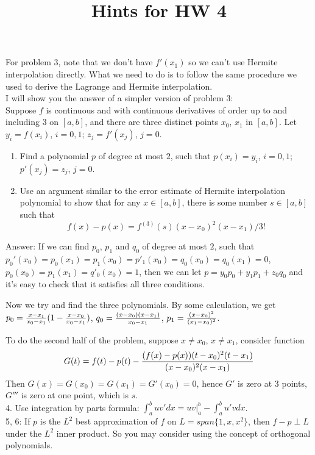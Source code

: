 \documentclass[20pt]{article} %
\title{Hints for HW 4}
\theoremstyle{break}
\begin{document}
\maketitle

For problem 3, note that we don't have $f'(x_1)$ so we can't use Hermite interpolation directly. What we need to do is to follow the same procedure we used to derive the Lagrange and Hermite interpolation.\\

I will show you the answer of a simpler version of problem 3:\\

Suppose $f$ is continuous and with continuous derivatives of order up to and including 3 on $[a, b]$, and there are three distinct points $x_0$, $x_1$ in $[a, b]$. Let $y_i=f(x_i)$, $i=0, 1$; $z_j=f'(x_j)$, $j=0$.
\begin{enumerate}
\item Find a polynomial $p$ of degree at most $2$, such that $p(x_i)=y_i$, $i=0, 1$; $p'(x_j)=z_j$, $j=0$.
\item Use an argument similar to the error estimate of Hermite interpolation polynomial to show that for any $x\in [a, b]$, there is some number $s\in [a, b]$ such that
  \[f(x)-p(x)=f^{(3)}(s)(x-x_0)^2(x-x_1)/3!\]
\end{enumerate}

Answer: If we can find $p_0$, $p_1$ and $q_0$ of degree at most $2$, such that $p_0'(x_0)=p_0(x_1)=p_1(x_0)=p'_1(x_0)=q_0(x_0)=q_0(x_1)=0$, $p_0(x_0)=p_1(x_1)=q'_0(x_0)=1$, then we can let $p=y_0p_0+y_1p_1+z_0q_0$ and it's easy to check that it satisfies all three conditions.

Now we try and find the three polynomials. By some calculation, we get $p_0={x-x_1\over x_0-x_1}(1-{x-x_0\over x_0-x_1})$, $q_0={(x-x_0)(x-x_1)\over x_0-x_1}$, $p_1={(x-x_0)^2\over (x_1-x_0)^2}$.

To do the second half of the problem, suppose $x\not=x_0$, $x\not=x_1$, consider function
\[G(t)=f(t)-p(t)-{(f(x)-p(x))(t-x_0)^2(t-x_1)\over (x-x_0)^2(x-x_1)}\]
Then $G(x)=G(x_0)=G(x_1)=G'(x_0)=0$, hence $G'$ is zero at 3 points, $G'''$ is zero at one point, which is $s$.\\

4. Use integration by parts formula: $\int_a^buv'dx=uv|_a^b-\int_a^bu'vdx$.\\

5, 6: If $p$ is the $L^2$ best approximation of $f$ on $L=span\{1, x, x^2\}$, then $f-p\perp L$ under the $L^2$ inner product. So you may consider using the concept of orthogonal polynomials.
\end{document}
